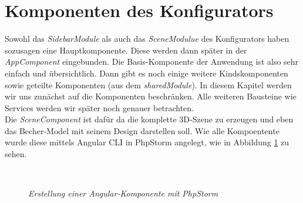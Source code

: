 \section{Komponenten des Konfigurators}
\label{sec:umsetzung}
%
Sowohl das \textit{SidebarModule} als auch das \textit{SceneModulue} des Konfigurators haben sozusagen eine \glqq Hauptkomponente\grqq. Diese werden dann später in der \textit{AppComponent} eingebunden. Die Basis-Komponente der Anwendung ist also sehr einfach und übersichtlich. Dann gibt es noch einige weitere Kindskomponenten sowie geteilte Komponenten (aus dem \textit{sharedModule}). In diesem Kapitel werden wir uns zunächst auf die Komponenten beschränken. Alle weiteren Bausteine wie Services werden wir später noch genauer betrachten.\\
Die \textit{SceneComponent} ist dafür da die komplette 3D-Szene zu erzeugen und eben das Becher-Model mit seinem Design darstellen soll. Wie alle Kompoentente wurde diese mittels Angular CLI in PhpStorm angelegt, wie in Abbildung \ref{fig:phpstorm} zu sehen. 
%
\begin{figure}[h]
	\centering
	\\	
	\caption{\textit{Erstellung einer Angular-Komponente mit PhpStorm}}
	\label{fig:phpstorm}
\end{figure}

